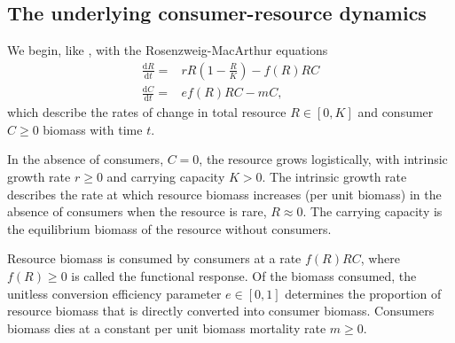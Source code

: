 \documentclass[11pt]{article}
\begin{document}
\subsection*{The underlying consumer-resource dynamics}
We begin, like \cite{Gilbert2014}, with the Rosenzweig-MacArthur equations \citep{Rosenzweig1963}
\begin{equation}\label{eq:RM}
\begin{aligned}
\frac{\mathrm{d}R}{\mathrm{d}t} =& r R \left(1 - \frac{R}{K} \right) - f(R) R C\\
\frac{\mathrm{d}C}{\mathrm{d}t} =& e f(R) R C - m C,
\end{aligned}
\end{equation}
which describe the rates of change in total resource $R\in[0,K]$ and consumer $C\geq0$ biomass with time $t$.

In the absence of consumers, $C=0$, the resource grows logistically, with intrinsic growth rate $r\geq0$ and carrying capacity $K>0$.
The intrinsic growth rate describes the rate at which resource biomass increases (per unit biomass) in the absence of consumers when the resource is rare, $R\approx0$.
The carrying capacity is the equilibrium biomass of the resource without consumers.

Resource biomass is consumed by consumers at a rate $f(R) R C$, where $f(R)\geq0$ is called the functional response.
Of the biomass consumed, the unitless conversion efficiency parameter $e\in[0,1]$ determines the proportion of resource biomass that is directly converted into consumer biomass.
Consumers biomass dies at a constant per unit biomass mortality rate $m\geq0$.
\end{document}
